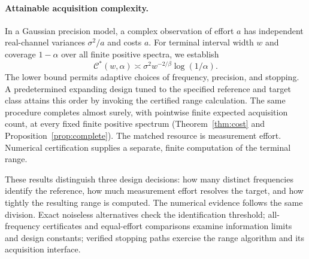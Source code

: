\documentclass[10pt]{amsart}
\theoremstyle{definition}
\theoremstyle{remark}
\theoremstyle{plain}
\begin{document}
\paragraph{Attainable acquisition complexity.}
In a Gaussian precision model, a complex observation of effort $a$ has independent real-channel variances $\sigma^2/a$ and costs $a$. For terminal interval width $w$ and coverage $1-\alpha$ over all finite positive spectra, we establish
\begin{equation}\label{eq:cost-summary}
 \mathcal C^*(w,\alpha)\asymp\sigma^2w^{-2/\beta}\log(1/\alpha).
\end{equation}
The lower bound permits adaptive choices of frequency, precision, and stopping. A predetermined expanding design tuned to the specified reference and target class attains this order by invoking the certified range calculation. The same procedure completes almost surely, with pointwise finite expected acquisition count, at every fixed finite positive spectrum (Theorem~\ref{thm:cost} and Proposition~\ref{prop:complete}). The matched resource is measurement effort. Numerical certification supplies a separate, finite computation of the terminal range.

These results distinguish three design decisions: how many distinct frequencies identify the reference, how much measurement effort resolves the target, and how tightly the resulting range is computed. The numerical evidence follows the same division. Exact noiseless alternatives check the identification threshold; all-frequency certificates and equal-effort comparisons examine information limits and design constants; verified stopping paths exercise the range algorithm and its acquisition interface.
\end{document}
